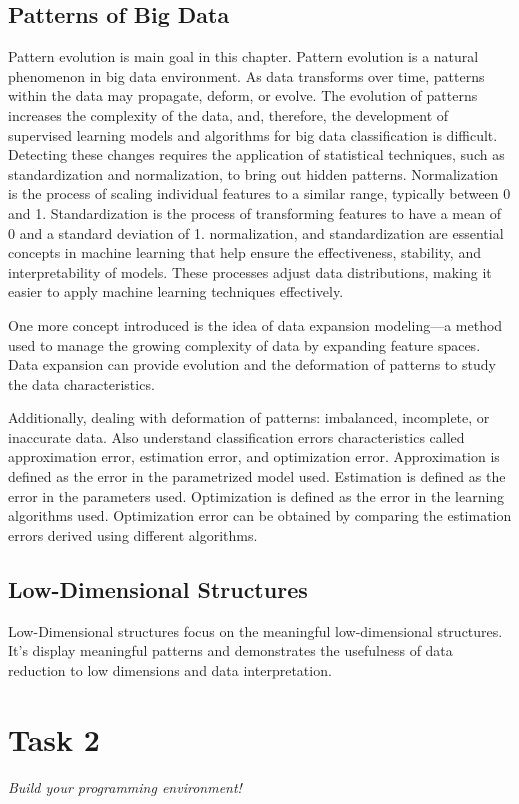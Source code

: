 \documentclass[conference,12pt]{IEEEtran}
\begin{document}
\subsection{Patterns of Big Data}
Pattern evolution is main goal in this chapter. Pattern evolution is a natural phenomenon in big data environment. As data transforms over time, patterns within the data may propagate, deform, or evolve. The evolution of patterns increases the complexity of the data, and, therefore, the development of supervised learning models and algorithms for big data classification is difficult. Detecting these changes requires the application of statistical techniques, such as standardization and normalization, to bring out hidden patterns. Normalization is the process of scaling individual features to a similar range, typically between 0 and 1. Standardization is the process of transforming features to have a mean of 0 and a standard deviation of 1. normalization, and standardization are essential concepts in machine learning that help ensure the effectiveness, stability, and interpretability of models. These processes adjust data distributions, making it easier to apply machine learning techniques effectively.

One more concept introduced is the idea of data expansion modeling—a method used to manage the growing complexity of data by expanding feature spaces. Data expansion can provide evolution and the deformation of patterns to study the data characteristics.

Additionally, dealing with deformation of patterns: imbalanced, incomplete, or inaccurate data. Also understand classification errors characteristics called approximation error, estimation error, and optimization error. Approximation is defined as the error in the parametrized model used. Estimation is defined as the error in the parameters used. Optimization is defined as the error in the learning algorithms used. Optimization error can be
obtained by comparing the estimation errors derived using different algorithms.

\subsection{Low-Dimensional Structures}
Low-Dimensional structures focus on the meaningful low-dimensional structures. It’s display meaningful patterns and demonstrates the usefulness of data reduction to low dimensions and data interpretation.

\section{Task 2}
\textit{Build your programming environment!}\\
\end{document}
